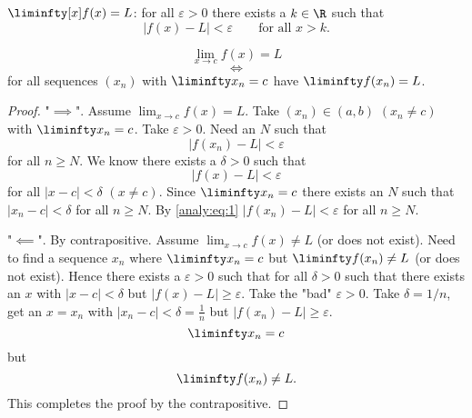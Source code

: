 \documentclass[10pt, a4paper]{article}
\begin{document}
\begin{definition}
    $\liminfty[x] f(x) = L$:
    for all $\varepsilon > 0$ there exists a $k \in \R$ such that
    \[
    |f(x) - L| < \varepsilon\qquad\text{for all } x > k.
    \]
\end{definition}

\begin{proposition}
    \[
    \lim_{x \to c}f(x) = L
    \]
    \[
    \iff
    \]
    for all sequences $(x_n)$ with $\liminfty x_n = c$ have $\liminfty f(x_n) = L$.
    \begin{proof}
        "$\implies$".
        Assume $\lim_{x \to c}f(x) = L$.
        Take $(x_n) \in (a, b)$ $(x_n \neq c)$ with $\liminfty x_n = c$.
        Take $\varepsilon > 0$.
        Need an $N$ such that
        \[
        |f(x_n) - L| < \varepsilon
        \]
        for all $n \geq N$.
        We know there exists a $\delta > 0$ such that
        \begin{equation}\label{analy:eq:1}
            |f(x) - L| < \varepsilon
        \end{equation}
        for all $|x - c| < \delta$ $(x \neq c)$.
        Since $\liminfty x_n = c$ there exists an $N$ such that $|x_n - c| < \delta$ for all $n \geq N$.
        By \eqref{analy:eq:1} $|f(x_n) - L| < \varepsilon$ for all $n \geq N$.

        "$\impliedby$".
        By contrapositive.
        Assume $\lim_{x \to c}f(x) \neq L$
        (or does not exist).
        Need to find a sequence $x_n$ where $\liminfty x_n = c$ but $\liminfty f(x_n) \neq L$
        (or does not exist).
        Hence there exists a $\varepsilon > 0$ such that for all $\delta > 0$ such that there exists an $x$ with $|x - c| < \delta$ but $|f(x) - L| \geq \varepsilon$.
        Take the "bad" $\varepsilon > 0$.
        Take $\delta = 1 / n$,
        get an $x = x_n$ with $|x_n - c| < \delta = \frac{1}{n}$ but $|f(x_n) - L| \geq \varepsilon$.
        \[
        \liminfty x_n = c
        \]
        but
        \[
        \liminfty f(x_n) \neq L.
        \]
        This completes the proof by the contrapositive.
    \end{proof}
\end{proposition}
\end{document}
